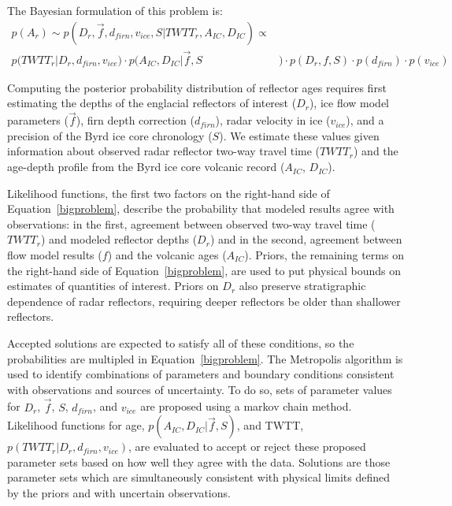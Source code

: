 The Bayesian formulation of this problem is:
\begin{equation}\label{bigproblem}
\begin{split} %
p(A_r)  \sim  p(D_r,\vec{f},d_{firn},v_{ice},S | TWTT_r,A_{IC},D_{IC})  \propto & \\
 p(TWTT_r | D_r,d_{firn},v_{ice})   \cdot p(A_{IC},D_{IC} | \vec{f},S&) \cdot p(D_r,f,S) \cdot p(d_{firn})\cdot p(v_{ice})
\end{split}
\end{equation}

Computing the posterior probability distribution of reflector ages requires first estimating the depths of the englacial reflectors of interest ($D_r$), ice flow model parameters ($\vec{f}$), firn depth correction ($d_{firn}$), radar velocity in ice ($v_{ice}$), and a precision of the Byrd ice core chronology ($S$). We estimate these values given information about observed radar reflector two-way travel time ($TWTT_r$) and the age-depth profile from the Byrd ice core volcanic record ($A_{IC}$, $D_{IC}$). 


Likelihood functions, the first two factors on the right-hand side of Equation~\ref{bigproblem}, describe the probability that modeled results agree with observations: in the first, agreement between observed two-way travel time ($TWTT_r$) and modeled reflector depths ($D_r$) and in the second, agreement between flow model results ($f$) and the volcanic ages ($A_{IC}$). Priors, the remaining terms on the right-hand side of Equation~\ref{bigproblem}, are used to put physical bounds on estimates of quantities of interest. Priors on ${D_r}$ also preserve stratigraphic dependence of radar reflectors, requiring deeper reflectors be older than shallower reflectors. 

Accepted solutions are expected to satisfy all of these conditions, so the probabilities are multipled in Equation~\ref{bigproblem}. The Metropolis algorithm is used to identify combinations of parameters and boundary conditions consistent with observations and sources of uncertainty. To do so, sets of parameter values for $D_r$, $\vec{f}$, $S$, $d_{firn}$, and $v_{ice}$ are proposed using a markov chain method. %
Likelihood functions for age, $p(A_{IC},D_{IC} | \vec{f},S)$, and TWTT, $p(TWTT_r | D_r,d_{firn},v_{ice})$, are evaluated to accept or reject these proposed parameter sets based on how well they agree with the data. Solutions are those parameter sets which are simultaneously consistent with physical limits defined by the priors and with uncertain observations. 

